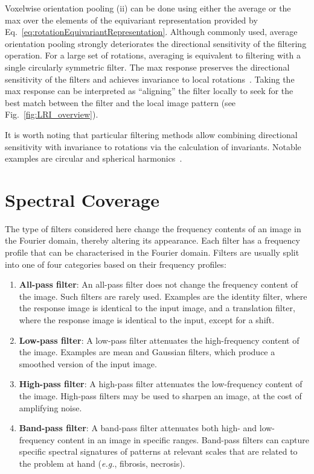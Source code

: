 \documentclass[fleqn,a4paper,oneside,openany]{book}
\begin{document}
Voxelwise orientation pooling (ii) can be done using either the average or the max over the elements of the equivariant representation provided by Eq.~\eqref{eq:rotationEquivariantRepresentation}.
Although commonly used, average orientation pooling strongly deteriorates the directional sensitivity of the filtering operation. For a large set of rotations, averaging is equivalent to filtering with a single circularly symmetric filter. 
The max response preserves the directional sensitivity of the filters and achieves invariance to local rotations~\cite{CoW2016b,AFO2019}.
Taking the max response can be  interpreted as ``aligning'' the filter locally to seek for the best match between the filter and the local image pattern (see Fig.~\ref{fig:LRI_overview}).

It is worth noting that particular filtering methods allow combining directional sensitivity with invariance to rotations via the calculation of invariants. Notable examples are circular and spherical harmonics~\cite{KaM2010,eickenberg2017solid,Depeursinge2018}.
%
\section{Spectral Coverage}\label{sec:spectalCoverage}
%
The type of filters considered here change the frequency contents of an image in the Fourier domain, thereby altering its appearance.
Each filter has a frequency profile that can be characterised in the Fourier domain. Filters are usually split into one of four categories based on their frequency profiles:
%
\begin{enumerate}
\item \textbf{All-pass filter}: An all-pass filter does not change the frequency content of the image. Such filters are rarely used. Examples are the identity filter, where the response image is identical to the input image, and a translation filter, where the response image is identical to the input, except for a shift.
\item \textbf{Low-pass filter}: A low-pass filter attenuates the high-frequency content of the image. Examples are mean and Gaussian filters, which produce a smoothed version of the input image.
\item \textbf{High-pass filter}: A high-pass filter attenuates the low-frequency content of the image. High-pass filters may be used to sharpen an image, at the cost of amplifying noise. 
\item \textbf{Band-pass filter}: A band-pass filter attenuates both high- and low-frequency content in an image in specific ranges.
Band-pass filters can capture specific spectral signatures of patterns at relevant scales that are related to the problem at hand (\textit{e.g.}, fibrosis, necrosis).
\end{enumerate}
\end{document}
